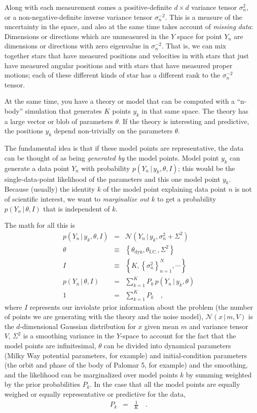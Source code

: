 \documentclass[12pt,pdftex,preprint]{aastex}
\newcommand{\setof}[1]{\left\{{#1}\right\}}
\newcommand{\given}{\,|\,}
\newcommand{\dyn}{\mathrm{dyn}}
\newcommand{\ic}{\mathrm{I.C.}}
\newcommand{\normal}{\mathscr{N}}
\begin{document}
Along with each measurement comes a positive-definite $d\times d$
variance tensor $\sigma^2_n$, or a non-negative-definite inverse
variance tensor $\sigma^{-2}_n$.  This is a measure of the uncertainty
in the space, and also at the same time takes account of \emph{missing
  data}: Dimensions or directions which are unmeasured in the $Y$
space for point $Y_n$ are dimensions or directions with zero
eigenvalue in $\sigma^{-2}_n$.  That is, we can mix together stars
that have measured positions and velocities in with stars that just
have measured angular positions and with stars that have measured
proper motions; each of these different kinds of star has a different
rank to the $\sigma^{-2}_n$ tensor.

At the same time, you have a theory or model that can be computed with
a ``n-body'' simulation that generates $K$ points $y_k$ in that same
space.  The theory has a large vector or blob of parameters $\theta$.
If the theory is interesting and predictive, the positions $y_k$
depend non-trivially on the parameters $\theta$.

The fundamental idea is that if these model points are representative,
the data can be thought of as being \emph{generated by} the model
points.  Model point $y_k$ can generate a data point $Y_n$ with
probability $p(Y_n\given y_k,\theta,I)$; this would be the
single-data-point likelihood of the parameters and this one model
point $y_k$.  Because (usually) the identity $k$ of the model point
explaining data point $n$ is not of scientific interest, we want to
\emph{marginalize out} $k$ to get a probability $p(Y_n\given\theta,I)$
that is independent of $k$.

The math for all this is
\begin{eqnarray}
p(Y_n\given y_k,\theta,I) &=& \normal(Y_n\given y_k,\sigma^2_n+\Sigma^2)
\\
\theta &\equiv& \setof{\theta_\dyn, \theta_\ic, \Sigma^2}
\\
I &\equiv& \setof{K, \setof{\sigma^2_n}_{n=1}^N, \cdots}
\\
p(Y_n\given\theta,I) &=& \sum_{k=1}^K P_k\,p(Y_n\given y_k,\theta)
\\
1 &=& \sum_{k=1}^K P_k
\quad ,
\end{eqnarray}
where $I$ represents our inviolate prior information about the problem
(the number of points we are generating with the theory and the noise
model), $\normal(x\given m, V)$ is the $d$-dimensional Gaussian
distribution for $x$ given mean $m$ and variance tensor $V$,
$\Sigma^2$ is a smoothing variance in the $Y$-space to account for the
fact that the model points are infinitesimal, $\theta$ can be divided
into dynamical parameters (Milky Way potential parameters, for
example) and initial-condition parameters (the orbit and phase of the
body of Palomar 5, for example) and the smoothing, and the likelihood
can be marginalized over model points $k$ by summing weighted by the
prior probabilities $P_k$.  In the case that all the model points are
equally weighed or equally representative or predictive for the data,
\begin{eqnarray}
P_k &=& \frac{1}{K}
\quad .
\end{eqnarray}
\end{document}
